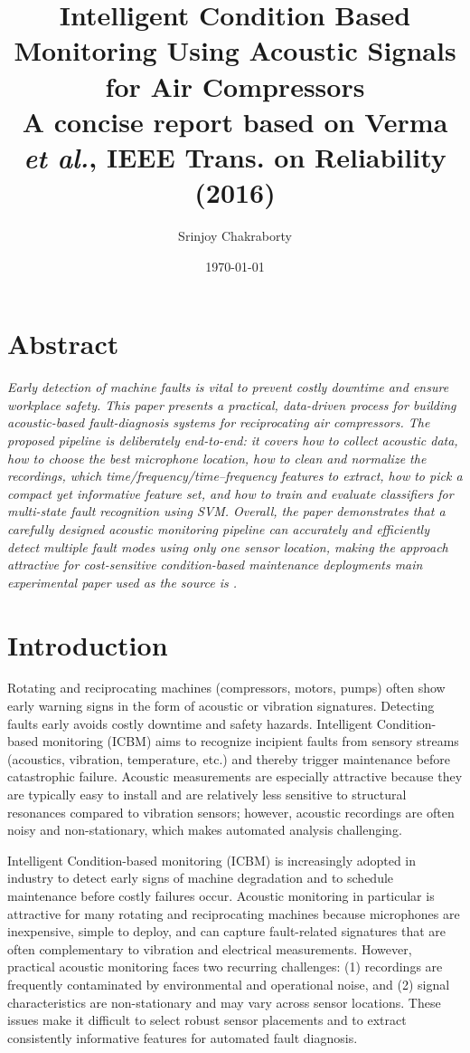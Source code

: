 \documentclass[12pt,a4paper]{article}
\title{Intelligent Condition Based Monitoring Using
Acoustic Signals for Air Compressors\\
\vspace{6pt}
\large A concise report based on Verma \textit{et al.}, IEEE Trans. on Reliability (2016)}
\author{Srinjoy Chakraborty}
\date{\today}
\begin{document}
\maketitle %
\newpage
\tableofcontents %
\listoffigures %
\newpage
\begin{multicols}{2}
\section{Abstract}
\textit{Early detection of machine faults is vital to prevent costly downtime and ensure workplace safety. This paper presents a practical, data-driven process for building acoustic-based fault-diagnosis systems for reciprocating air compressors. The proposed pipeline is deliberately end-to-end: it covers how to collect acoustic data, how to choose the best microphone location, how to clean and normalize the recordings, which time/frequency/time–frequency features to extract, how to pick a compact yet informative feature set, and how to train and evaluate classifiers for multi-state fault recognition using SVM.
Overall, the paper demonstrates that a carefully designed acoustic monitoring pipeline can accurately and efficiently detect multiple fault modes using only one sensor location, making the approach attractive for cost-sensitive condition-based maintenance deployments main experimental paper used as the source is \cite{Verma2016}.}


\section{Introduction}
Rotating and reciprocating machines (compressors, motors, pumps) often show early warning signs in the form of acoustic or vibration signatures. Detecting faults early avoids costly downtime and safety hazards. Intelligent Condition-based monitoring (ICBM) aims to recognize incipient faults from sensory streams (acoustics, vibration, temperature, etc.) and thereby trigger maintenance before catastrophic failure. Acoustic measurements are especially attractive because they are typically easy to install and are relatively less sensitive to structural resonances compared to vibration sensors; however, acoustic recordings are often noisy and non-stationary, which makes automated analysis challenging.

Intelligent Condition-based monitoring (ICBM) is increasingly adopted in industry to detect early signs of machine degradation and to schedule maintenance before costly failures occur. Acoustic monitoring in particular is attractive for many rotating and reciprocating machines because microphones are inexpensive, simple to deploy, and can capture fault-related signatures that are often complementary to vibration and electrical measurements. However, practical acoustic monitoring faces two recurring challenges: (1) recordings are frequently contaminated by environmental and operational noise, and (2) signal characteristics are non-stationary and may vary across sensor locations. These issues make it difficult to select robust sensor placements and to extract consistently informative features for automated fault diagnosis.


\end{multicols}
\end{document}
